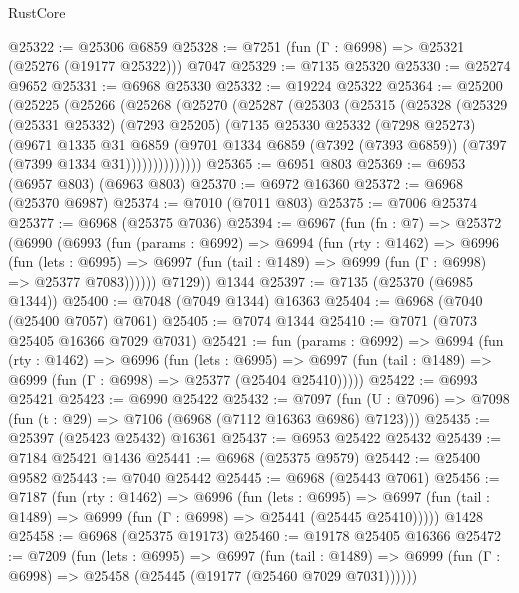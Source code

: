 \begin{lexlean}{RustCore}
\begin{coremodule}
@25322 := @25306 @6859
@25328 := @7251 (fun (Γ : @6998) => @25321 (@25276 (@19177 @25322))) @7047
@25329 := @7135 @25320
@25330 := @25274 @9652
@25331 := @6968 @25330
@25332 := @19224 @25322
@25364 := @25200
    (@25225
      (@25266
        (@25268
          (@25270
            (@25287
              (@25303
                (@25315
                  (@25328
                    (@25329
                      (@25331 @25332)
                      (@7293 @25205)
                      (@7135
                        @25330
                        @25332
                        (@7298 @25273)
                        (@9671
                          @1335
                          @31
                          @6859
                          (@9701
                            @1334
                            @6859
                            (@7392 (@7393 @6859))
                            (@7397 (@7399 @1334 @31))))))))))))))
@25365 := @6951 @803
@25369 := @6953 (@6957 @803) (@6963 @803)
@25370 := @6972 @16360
@25372 := @6968 (@25370 @6987)
@25374 := @7010 (@7011 @803)
@25375 := @7006 @25374
@25377 := @6968 (@25375 @7036)
@25394 := @6967
    (fun (fn : @7) =>
    @25372
      (@6990
        (@6993
          (fun (params : @6992) =>
          @6994
            (fun (rty : @1462) =>
            @6996
              (fun (lets : @6995) =>
              @6997 (fun (tail : @1489) => @6999 (fun (Γ : @6998) => @25377 @7083))))))
        @7129))
    @1344
@25397 := @7135 (@25370 (@6985 @1344))
@25400 := @7048 (@7049 @1344) @16363
@25404 := @6968 (@7040 (@25400 @7057) @7061)
@25405 := @7074 @1344
@25410 := @7071 (@7073 @25405 @16366 @7029 @7031)
@25421 := fun (params : @6992) =>
  @6994
    (fun (rty : @1462) =>
    @6996
      (fun (lets : @6995) =>
      @6997 (fun (tail : @1489) => @6999 (fun (Γ : @6998) => @25377 (@25404 @25410)))))
@25422 := @6993 @25421
@25423 := @6990 @25422
@25432 := @7097
    (fun (U : @7096) => @7098 (fun (t : @29) => @7106 (@6968 (@7112 @16363 @6986) @7123)))
@25435 := @25397 (@25423 @25432) @16361
@25437 := @6953 @25422 @25432
@25439 := @7184 @25421 @1436
@25441 := @6968 (@25375 @9579)
@25442 := @25400 @9582
@25443 := @7040 @25442
@25445 := @6968 (@25443 @7061)
@25456 := @7187
    (fun (rty : @1462) =>
    @6996
      (fun (lets : @6995) =>
      @6997 (fun (tail : @1489) => @6999 (fun (Γ : @6998) => @25441 (@25445 @25410)))))
    @1428
@25458 := @6968 (@25375 @19173)
@25460 := @19178 @25405 @16366
@25472 := @7209
    (fun (lets : @6995) =>
    @6997
      (fun (tail : @1489) =>
      @6999 (fun (Γ : @6998) => @25458 (@25445 (@19177 (@25460 @7029 @7031))))))

\end{coremodule}
\end{lexlean}
